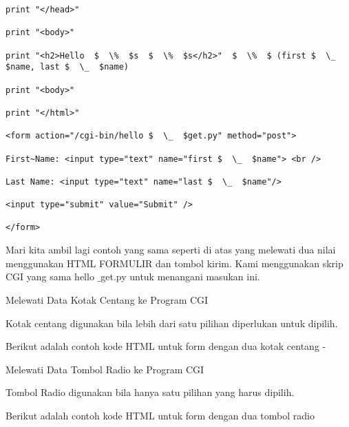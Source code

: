 \begin {enumerate}
\begin {enumerate}
\begin{verbatim}
print "</head>"

print "<body>"

print "<h2>Hello  $  \%  $s  $  \%  $s</h2>"  $  \%  $ (first $  \_  $name, last $  \_  $name)

print "<body>"

print "</html>"

<form action="/cgi-bin/hello $  \_  $get.py" method="post">

First~Name: <input type="text" name="first $  \_  $name"> <br />

Last Name: <input type="text" name="last $  \_  $name"/>

<input type="submit" value="Submit" />

</form>

\end{verbatim}
Mari kita ambil lagi contoh yang sama seperti di atas yang melewati dua nilai menggunakan HTML FORMULIR dan tombol kirim. Kami menggunakan skrip CGI yang sama hello $  \_  $get.py untuk menangani masukan ini.

Melewati Data Kotak Centang ke Program CGI

Kotak centang digunakan bila lebih dari satu pilihan diperlukan untuk dipilih.

Berikut adalah contoh kode HTML untuk form dengan dua kotak centang -

Melewati Data Tombol Radio ke Program CGI

Tombol Radio digunakan bila hanya satu pilihan yang harus dipilih.

Berikut adalah contoh kode HTML untuk form dengan dua tombol radio


\end{enumerate}
\end{enumerate}
